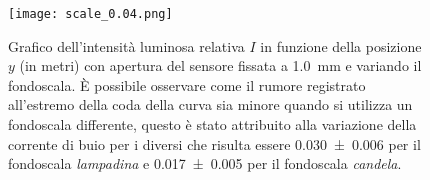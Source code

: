 \documentclass[../main.tex]{subfiles}
\begin{document}
\begin{figure}[ht!]
    \centering
    \texttt{[image: scale\_0.04.png]}
    \caption{Grafico dell'intensità luminosa relativa $I$ in funzione della posizione $y$ (in metri) con apertura del sensore fissata a \qty{1.0}{\mm} e variando il fondoscala. È possibile osservare come il rumore registrato all'estremo della coda della curva sia minore quando si utilizza un fondoscala differente, questo è stato attribuito alla variazione della corrente di buio per i diversi che risulta essere \num{0.030+-0.006} per il fondoscala \textit{lampadina} e \num{0.017+-0.005} per il fondoscala \textit{candela}.} %
\end{figure}
\end{document}
